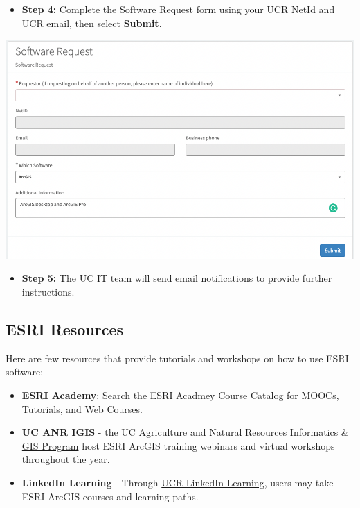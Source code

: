 \documentclass[
]{book}
\providecommand{\tightlist}{%
  \setlength{\itemsep}{0pt}\setlength{\parskip}{0pt}}
\begin{document}
\begin{itemize}
\tightlist
\item
  \textbf{Step 4:} Complete the Software Request form using your UCR NetId and UCR email, then select \textbf{Submit}.
\end{itemize}

\begin{center}\includegraphics{images/requestsubmit} \end{center}

\begin{itemize}
\tightlist
\item
  \textbf{Step 5:} The UC IT team will send email notifications to provide further instructions.
\end{itemize}

\hypertarget{esri-resources}{%
\subsection{ESRI Resources}\label{esri-resources}}

Here are few resources that provide tutorials and workshops on how to use ESRI software:

\begin{itemize}
\tightlist
\item
  \textbf{ESRI Academy}: Search the ESRI Acadmey \href{https://www.esri.com/training/}{Course Catalog} for MOOCs, Tutorials, and Web Courses.
\item
  \textbf{UC ANR IGIS} - the \href{https://igis.ucanr.edu/Training/}{UC Agriculture and Natural Resources Informatics \& GIS Program} host ESRI ArcGIS training webinars and virtual workshops throughout the year.
\item
  \textbf{LinkedIn Learning} - Through \href{https://www.linkedin.com/learning/topics/arcgis?u=26135898}{UCR LinkedIn Learning}, users may take ESRI ArcGIS courses and learning paths.
\end{itemize}
\end{document}
